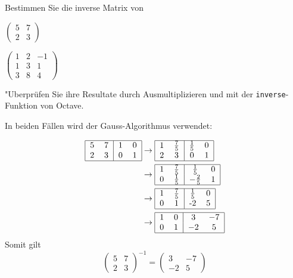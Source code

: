 Bestimmen Sie die inverse Matrix von
\begin{teilaufgaben}
\item
$
\begin{pmatrix}
5&7\\
2&3
\end{pmatrix}
$
\item
$
\begin{pmatrix}
1&2&-1\\
1&3&1\\
3&8&4
\end{pmatrix}
$
\end{teilaufgaben}
"Uberprüfen Sie ihre Resultate durch Ausmultiplizieren und mit der
{\tt inverse}-Funktion von Octave.

\begin{loesung}
In beiden Fällen wird der Gauss-Algorithmus verwendet:
\begin{teilaufgaben}
\item
\begin{align*}
\begin{tabular}{|cc|cc|}
\hline
5&7&1&0\\
2&3&0&1\\
\hline
\end{tabular}
&
\rightarrow
\begin{tabular}{|cc|cc|}
\hline
1&$\frac75$&$\frac15$&0\\
2&3&0&1\\
\hline
\end{tabular}
\\
&
\rightarrow
\begin{tabular}{|cc|cc|}
\hline
1&$\frac75$&$\frac15$&0\\
0&$\frac15$&$-\frac25$&1\\
\hline
\end{tabular}
\\
&
\rightarrow
\begin{tabular}{|cc|cc|}
\hline
1&$\frac75$&$\frac15$&0\\
0&1&-2&5\\
\hline
\end{tabular}
\\
&
\rightarrow
\begin{tabular}{|cc|cc|}
\hline
1&0&3&$-7$\\
0&1&$-2$&5\\
\hline
\end{tabular}
\end{align*}
Somit gilt
\[
\begin{pmatrix}
5&7\\
2&3
\end{pmatrix}^{-1}=
\begin{pmatrix}
3&-7\\-2&5
\end{pmatrix}
\]


\end{teilaufgaben}
\end{loesung}

